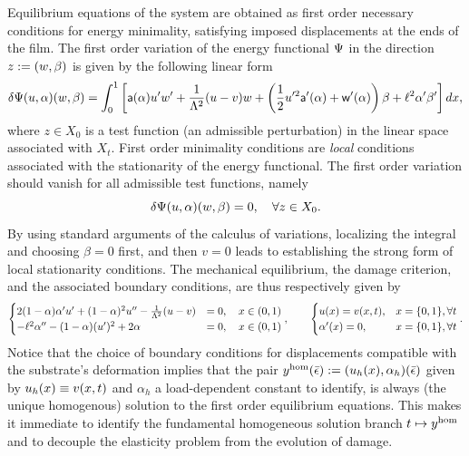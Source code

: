 \documentclass[10pt]{article}
\begin{document}
Equilibrium equations of the system are obtained as first order necessary conditions for energy minimality, satisfying imposed displacements at the ends of the film.
The first order variation of the energy functional $\Psi$ in the direction $z:=(w, \beta)$ is given by the following linear form
\begin{equation}
    \delta \Psi(u,\alpha)(w,\beta)=\int_0^1
    \left[\mathsf{a}(\alpha)u'w'+\frac{1}{\Lambda^2} (u-v) w+ \left( \frac{1}{2}u'^2 \mathsf{a}'(\alpha)+\mathsf{w}'(\alpha) \right)\beta+\ell^2\alpha'\beta' \right]dx,\label{firstvar1}
\end{equation}
where
%
$z\in X_0$ is a test function (an admissible perturbation) in the linear space associated with  $X_t$. First order minimality conditions are \emph{local} conditions  associated with  the stationarity of the energy functional. The first order variation should vanish for all admissible test functions, namely
\begin{equation}
    \label{eq:stationarity}
    \delta \Psi(u,\alpha)(w,\beta)=0, \quad \forall z\in X_0.
\end{equation}
%
By using standard arguments of the calculus of variations, localizing the integral and choosing $\beta = 0$ first, and then $v =0$ leads to establishing the strong form of local stationarity conditions. The mechanical equilibrium, the damage criterion, {and the associated boundary conditions, } are thus respectively given by
\begin{eqnarray}
    \begin{cases}
        2(1-\alpha)\alpha' u' +(1-\alpha)^2 u'' -  \frac{1}{\Lambda^2}(u-v) & = 0, \quad {x\in (0, 1)} \\
        -\ell^2\alpha'' - (1-\alpha)( u')^2 + 2\alpha                         & = 0, \quad {x\in (0, 1)}
    \end{cases}
    ,    \qquad
    \begin{cases}
        u(x)       = v(x, t), & x=\{0, 1\}, \forall t \\
        \alpha'(x) = 0,            & x=\{0, 1\}, \forall t \\
    \end{cases}
    .
    \label{auto1}
\end{eqnarray}
Notice that the choice of boundary conditions for displacements compatible with the substrate's deformation implies that the pair $y^{\text{hom}}(\bar\epsilon):=(u_h(x), \alpha_h)(\bar\epsilon)$ given by $u_h(x)\equiv v(x, t)$ and $\alpha_h$ a load-dependent constant to identify, is always (the unique homogenous) solution to the first order equilibrium equations. This makes it immediate to identify the fundamental homogeneous solution branch $t \mapsto y^{\text{hom}}$ and to decouple the elasticity problem from the  evolution of damage.
\end{document}
